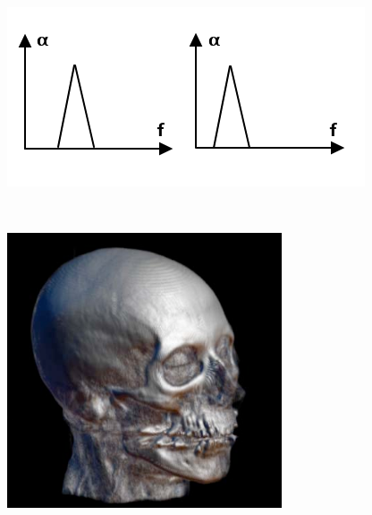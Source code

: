 \begin{figure}
        \centering
        \begin{minipage}{0.5\textwidth}
                \centering
                \includegraphics[width=1\linewidth]{images/glk_transfunction_tf.png}
        \end{minipage}~
        \begin{minipage}{0.25\textwidth}
                \centering
                \includegraphics[width=1\linewidth]{images/glk_transfunction_1.png}

\end{minipage}
\end{figure}
